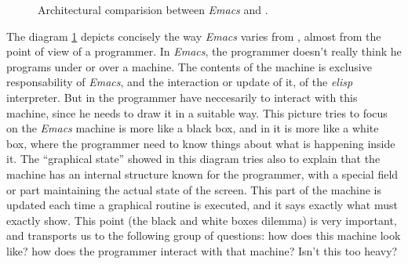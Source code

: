\documentclass{article}
\begin{document}
\begin{figure}[h!]
\begin{center}

\end{center}

\caption{Architectural comparision between \emph{Emacs} and \fav.}
\label{fig:archs}
\end{figure}

The diagram \ref{fig:archs} depicts concisely the way \textit{Emacs}
varies from \fav, almost from the point of view of a programmer. In
\textit{Emacs}, the programmer doesn't really think he programs under or over a
machine. The contents of the machine is exclusive responsability of
\textit{Emacs}, and the interaction or update of it, of the \textit{elisp}
interpreter. But in \fav the programmer have neccesarily to interact with this
machine, since he needs to draw it in a suitable way. This picture tries to
focus on the \textit{Emacs} machine is more like a black box, and in \fav it is
more like a white box, where the programmer need to know things about what is
happening inside it. The ``graphical state'' showed in this diagram tries also
to explain that the machine has an internal structure known for the programmer,
with a special field or part maintaining the actual state of the screen. This
part of the machine is updated each time a graphical routine is executed, and it
says exactly what \fav must exactly show. This point (the black and white boxes
dilemma) is very important, and transports us to the following group of
questions: how does this machine look like? how does the programmer interact
with that machine? Isn't this too heavy?
\end{document}
